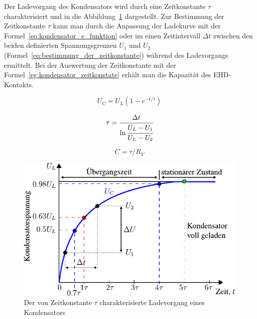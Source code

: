 Der Ladevorgang des Kondensators wird durch eine Zeitkonstante $\tau$ charakterisiert und in die Abbildung~\ref{fig:ladevorgang_eines_kondensators} dargestellt.
Zur Bestimmung der Zeitkonstante $\tau$ kann man durch die Anpassung der Ladekurve mit der Formel~\ref{eq:kondensator_e_funktion} oder im einen Zeitintervall $\Delta t$ zwischen den beiden definierten Spannungsgrenzen $U_1$ und $U_2$ (Formel~\ref{eq:bestimmung_der_zeitkonstante}) während des Ladevorgangs ermittelt.
Bei der Auswertung der Zeitkonstante mit der Formel~\ref{eg:kondensator_zeitkonstate} erhält man die Kapazität des EHD-Kontakts.

\begin{minipage}[b]{0.3\textwidth}
    \begin{equation}
        U_C = U_L (1 - e ^ {-t/\tau})
        \label{eq:kondensator_e_funktion}
    \end{equation}
\end{minipage}
%
\begin{minipage}[b]{0.3\textwidth}
    \begin{equation}
        \tau = \cfrac{\Delta t}{\ln \cfrac{U_L - U_1}{U_L - U_2}}
        \label{eq:bestimmung_der_zeitkonstante}
    \end{equation}
\end{minipage}
%
\begin{minipage}[b]{0.3\textwidth}
    \begin{equation}
        C = \tau / R_V
        \label{eg:kondensator_zeitkonstate}
    \end{equation}
\end{minipage}

\begin{figure}[htb]
    \centering
    \includegraphics[]{./images/kondensator_ladevorgang.pdf}
    \caption{Der von Zeitkonstante $\tau$ charakterisierte Ladevorgang eines Kondensators}
    \label{fig:ladevorgang_eines_kondensators}
\end{figure}

